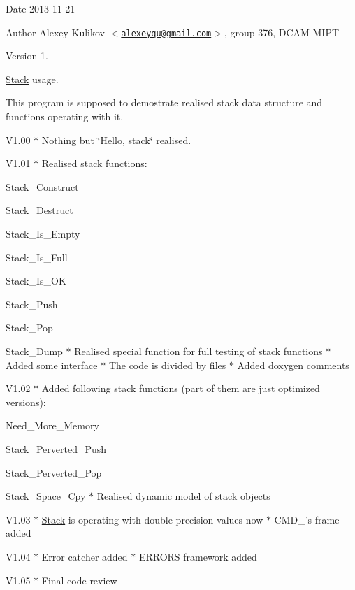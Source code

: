 \begin{DoxyDate}{\-Date}
2013-\/11-\/21 
\end{DoxyDate}
\begin{DoxyAuthor}{\-Author}
\-Alexey \-Kulikov $<$\href{mailto:alexeyqu@gmail.com}{\tt alexeyqu@gmail.\-com}$>$, group 376, \-D\-C\-A\-M \-M\-I\-P\-T 
\end{DoxyAuthor}
\begin{DoxyVersion}{\-Version}
1.
\end{DoxyVersion}
\hyperlink{structStack}{\-Stack} usage.

\begin{DoxyParagraph}{\-This program is supposed to demostrate realised stack data structure}
and functions operating with it.
\end{DoxyParagraph}
\begin{DoxyParagraph}{\-V1.00}
$\ast$ \-Nothing but \char`\"{}\-Hello, stack\char`\"{} realised.
\end{DoxyParagraph}
\begin{DoxyParagraph}{\-V1.01}
$\ast$ \-Realised stack functions\-:
\begin{DoxyItemize}
\item \-Stack\-\_\-\-Construct
\item \-Stack\-\_\-\-Destruct
\item \-Stack\-\_\-\-Is\-\_\-\-Empty
\item \-Stack\-\_\-\-Is\-\_\-\-Full
\item \-Stack\-\_\-\-Is\-\_\-\-O\-K
\item \-Stack\-\_\-\-Push
\item \-Stack\-\_\-\-Pop
\item \-Stack\-\_\-\-Dump $\ast$ \-Realised special function for full testing of stack functions $\ast$ \-Added some interface $\ast$ \-The code is divided by files $\ast$ \-Added doxygen comments
\end{DoxyItemize}
\end{DoxyParagraph}
\begin{DoxyParagraph}{\-V1.02}
$\ast$ \-Added following stack functions (part of them are just optimized versions)\-:
\begin{DoxyItemize}
\item \-Need\-\_\-\-More\-\_\-\-Memory
\item \-Stack\-\_\-\-Perverted\-\_\-\-Push
\item \-Stack\-\_\-\-Perverted\-\_\-\-Pop
\item \-Stack\-\_\-\-Space\-\_\-\-Cpy $\ast$ \-Realised dynamic model of stack objects
\end{DoxyItemize}
\end{DoxyParagraph}
\begin{DoxyParagraph}{\-V1.03}
$\ast$ \hyperlink{structStack}{\-Stack} is operating with double precision values now $\ast$ \-C\-M\-D\-\_\-'s frame added
\end{DoxyParagraph}
\begin{DoxyParagraph}{\-V1.04}
$\ast$ \-Error catcher added $\ast$ \-E\-R\-R\-O\-R\-S framework added
\end{DoxyParagraph}
\begin{DoxyParagraph}{\-V1.05}
$\ast$ \-Final code review 
\end{DoxyParagraph}
